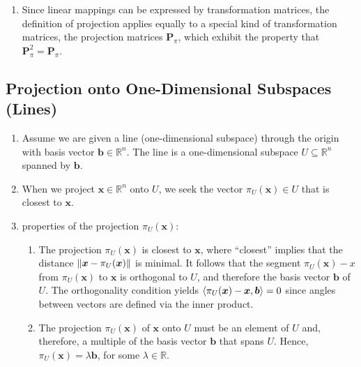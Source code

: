 \begin{enumerate}
    \item Since linear mappings can be expressed by transformation matrices, the definition of projection applies equally to a special kind  of transformation matrices, the projection matrices $\bm{P}_\pi$, which exhibit the property that $\bm{P}^2_\pi = \bm{P}_\pi$.
    \hfill \cite{mfml/book/mml/Deisenroth-Faisal-Ong}
\end{enumerate}



\subsection{Projection onto One-Dimensional Subspaces (Lines)}

\begin{enumerate}
    \item Assume we are given a line (one-dimensional subspace) through the origin with basis vector $\bm{b} \in \mathbb{R}^n$.
    The line is a one-dimensional subspace $U \subseteq \mathbb{R}^n$ spanned by $\bm{b}$. 
    \hfill \cite{mfml/book/mml/Deisenroth-Faisal-Ong}

    \item When we project $\bm{x} \in \mathbb{R}^n$ onto $U$, we seek the vector $\pi_U (\bm{x}) \in U$ that is closest to $\bm{x}$.
    \hfill \cite{mfml/book/mml/Deisenroth-Faisal-Ong}

    \item properties of the projection $\pi_U (\bm{x})$:
    \begin{enumerate}
        \item The projection $\pi _U (\bm{x})$ is closest to $\bm{x}$, where “closest” implies that the distance $\left\| \bm{x} - \pi _U (\bm{x}) \right\|$ is minimal. 
        It follows that the segment $\pi _U (\bm{x}) - x$ from $\pi _U (\bm{x})$ to $\bm{x}$ is orthogonal to $U$, and therefore the basis vector $\bm{b}$ of $U$. 
        The orthogonality condition yields $\langle\pi _U (\bm{x})  -  \bm{x}, \bm{b}\rangle = 0$ since angles between vectors are defined via the inner product.
        \hfill \cite{mfml/book/mml/Deisenroth-Faisal-Ong}

        \item The projection $\pi_U (\bm{x})$ of $\bm{x}$ onto $U$ must be an element of $U$ and, therefore, a multiple of the basis vector $\bm{b}$ that spans $U$. 
        Hence, $\pi_U (\bm{x}) = \lambda\bm{b}$, for some $\lambda \in \mathbb{R}$.
        \hfill \cite{mfml/book/mml/Deisenroth-Faisal-Ong}
    \end{enumerate}


\end{enumerate}
